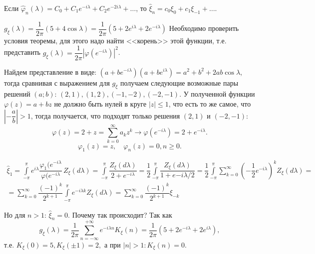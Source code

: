 \begin{corollary}
  Если $\hat{\varphi}_n (\lambda) = C_0 + C_1 e^{-i\lambda} + C_2 e^{-2i\lambda} + \dots$, то
  $\hat{\xi}_n = c_0 \xi_0 + c_1 \xi_{-1} + \dots$.
\end{corollary}

\begin{ex}
  $g_\xi(\lambda) = \dfrac{1}{2\pi} (5 + 4 \cos \lambda) = \dfrac{1}{2\pi} (5 + 2e^{i\lambda} + 2e^{-i\lambda})$
  Необходимо проверить условия теоремы, для этого надо найти <<корень>> этой функции, т.е.
  представить $g_\xi(\lambda) = \dfrac{1}{2\pi} |\varphi(e^{-i\lambda})|^2$.

  Найдем представление в виде: $(a+be^{-i\lambda})(a+be^{i\lambda}) = a^2 + b^2 + 2ab \cos\lambda$,
  тогда сравнивая с выражением для $g_\xi$ получаем следующие возможные пары решений $(a; b)$:
  $(2, 1), (1, 2), (-1, -2), (-2, -1)$.
  У полученной функции $\varphi(z) = a+bz$ не должно быть нулей в круге $|z| \leqslant 1$, что
  есть то же самое, что $\left|- \dfrac{a}{b}\right| > 1$, тогда получается, что подходят только
  решения $(2, 1)$ и $(-2, -1)$:
  \[
    \varphi(z) = 2 + z = \sum_{k=0}^\infty a_k z^k \rightarrow 
    \varphi(e^{-i\lambda}) = 2 + e^{-i\lambda}.
  \]
  \[
    \varphi_1(z) = z, \quad
    \varphi_n (z) = 0, n\geqslant 0.
  \]

  \begin{multline*}
    \hat{\xi}_1 = \int\limits_{-\pi}^\pi e^{i\lambda} \dfrac{\varphi_1(e^{-i\lambda}}{\varphi(e^{-i\lambda}} \, Z_\xi(d\lambda) = \int\limits_{-\pi}^\pi \dfrac{Z_\xi(d\lambda)}{2+e^{-i\lambda}} =
    \dfrac{1}{2} \int\limits_{-\pi}^\pi \dfrac{Z_\xi(d\lambda)}{1 + e{-i\lambda} / 2} =
    \dfrac{1}{2} \int\limits_{-\pi}^\pi \sum_{k=0}^\infty \left( - \dfrac{1}{2} e^{-i\lambda} \right)^k Z_\xi(d\lambda) = \\
    = \sum_{k=0}^\infty \dfrac{(-1)^k}{2^{k+1}} \int\limits_{-\pi}^\pi e^{-i\lambda k} Z_\xi(d\lambda) =
    \sum_{k=0}^\infty \dfrac{(-1)^k}{2^{k+1}} \xi_{-k}
  \end{multline*}

  Но для $n > 1$: $\hat{\xi}_n = 0$. Почему так происходит?
  Так как
  \[
    g_\xi(\lambda) = \dfrac{1}{2\pi} \sum_{n=-\infty}^{+\infty} e^{- i\lambda n} K_\xi(n) = \dfrac{1}{2\pi} (5+2e^{-i\lambda} + 2e^{i\lambda}),
  \]
  т.е. $K_\xi(0) = 5, K_\xi(\pm 1) = 2,$ а при $|n| > 1: K_\xi(n) = 0$.
\end{ex}

